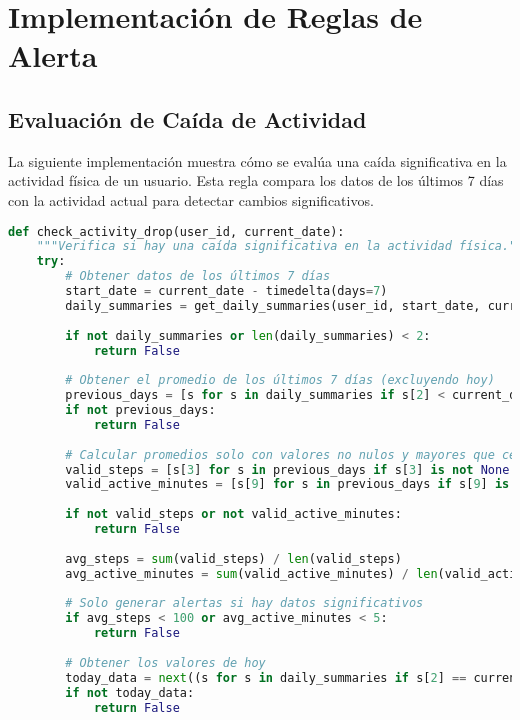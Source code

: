 \section{Implementación de Reglas de Alerta}
\label{sec:anexo_alertas}

\subsection{Evaluación de Caída de Actividad}
\label{subsec:anexo_actividad_drop}
La siguiente implementación muestra cómo se evalúa una caída significativa en la actividad física de un usuario. Esta regla compara los datos de los últimos 7 días con la actividad actual para detectar cambios significativos.

\begin{lstlisting}[language=Python, caption=Implementación de la regla de alerta para caída de actividad]
def check_activity_drop(user_id, current_date):
    """Verifica si hay una caída significativa en la actividad física."""
    try:
        # Obtener datos de los últimos 7 días
        start_date = current_date - timedelta(days=7)
        daily_summaries = get_daily_summaries(user_id, start_date, current_date)
        
        if not daily_summaries or len(daily_summaries) < 2:
            return False
            
        # Obtener el promedio de los últimos 7 días (excluyendo hoy)
        previous_days = [s for s in daily_summaries if s[2] < current_date.date()]
        if not previous_days:
            return False
            
        # Calcular promedios solo con valores no nulos y mayores que cero
        valid_steps = [s[3] for s in previous_days if s[3] is not None and s[3] > 0]
        valid_active_minutes = [s[9] for s in previous_days if s[9] is not None and s[9] > 0]
        
        if not valid_steps or not valid_active_minutes:
            return False
            
        avg_steps = sum(valid_steps) / len(valid_steps)
        avg_active_minutes = sum(valid_active_minutes) / len(valid_active_minutes)
        
        # Solo generar alertas si hay datos significativos
        if avg_steps < 100 or avg_active_minutes < 5:
            return False
            
        # Obtener los valores de hoy
        today_data = next((s for s in daily_summaries if s[2] == current_date.date()), None)
        if not today_data:
            return False
            

\end{lstlisting}
